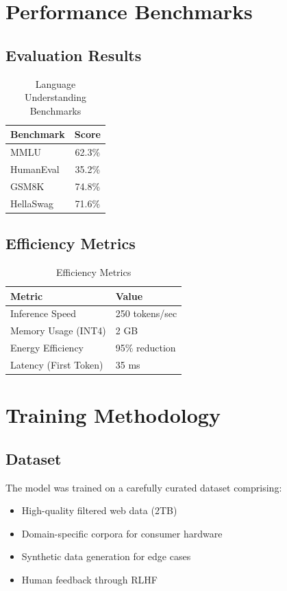 \documentclass[11pt,a4paper]{article}
\begin{document}
\section{Performance Benchmarks}

\subsection{Evaluation Results}

\begin{table}[H]
\centering
\begin{tabular}{lc}
\toprule
\textbf{Benchmark} & \textbf{Score} \\
\midrule
MMLU & 62.3\% \\
HumanEval & 35.2\% \\
GSM8K & 74.8\% \\
HellaSwag & 71.6\% \\
\bottomrule
\end{tabular}
\caption{Language Understanding Benchmarks}
\end{table}

\subsection{Efficiency Metrics}

\begin{table}[H]
\centering
\begin{tabular}{ll}
\toprule
\textbf{Metric} & \textbf{Value} \\
\midrule
Inference Speed & 250 tokens/sec \\
Memory Usage (INT4) & 2 GB \\
Energy Efficiency & 95\% reduction \\
Latency (First Token) & 35 ms \\
\bottomrule
\end{tabular}
\caption{Efficiency Metrics}
\end{table}

\section{Training Methodology}

\subsection{Dataset}
The model was trained on a carefully curated dataset comprising:
\begin{itemize}
    \item High-quality filtered web data (2TB)
    \item Domain-specific corpora for consumer hardware
    \item Synthetic data generation for edge cases
    \item Human feedback through RLHF
\end{itemize}
\end{document}
